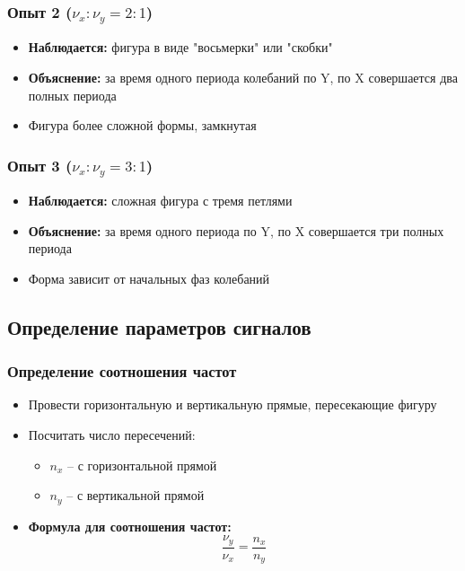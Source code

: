 \documentclass[14pt, a4paper, twoside]{extreport}
\begin{document}
\subsubsection{Опыт 2 ($\nu_x : \nu_y = 2:1$)}
\begin{itemize}
  \item \textbf{Наблюдается:} фигура в виде "восьмерки" или "скобки"
  \item \textbf{Объяснение:} за время одного периода колебаний по Y, по X совершается два полных периода
  \item Фигура более сложной формы, замкнутая
\end{itemize}

\subsubsection{Опыт 3 ($\nu_x : \nu_y = 3:1$)}
\begin{itemize}
  \item \textbf{Наблюдается:} сложная фигура с тремя петлями
  \item \textbf{Объяснение:} за время одного периода по Y, по X совершается три полных периода
  \item Форма зависит от начальных фаз колебаний
\end{itemize}

\subsection{Определение параметров сигналов}

\subsubsection{Определение соотношения частот}
\begin{itemize}
  \item Провести горизонтальную и вертикальную прямые, пересекающие фигуру
  \item Посчитать число пересечений:
    \begin{itemize}
      \item $n_x$ -- с горизонтальной прямой
      \item $n_y$ -- с вертикальной прямой
    \end{itemize}
  \item \textbf{Формула для соотношения частот:}
    \[
      \frac{\nu_y}{\nu_x} = \frac{n_x}{n_y}
    \]
\end{itemize}
\end{document}
